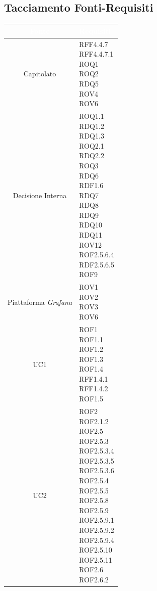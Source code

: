 \subsection{Tacciamento Fonti-Requisiti}\label{Tracciamento}
\begin{center}
\begin{longtable}[c]{|c|m{}|}
\hline
\rowcolor{bluelogo}\textbf{\textcolor{white}{Fonte}} & \textbf{\textcolor{white}{Requisiti}}\\
\hline \hline
\endhead
Capitolato & \makecell{RFF4.4.7\\RFF4.4.7.1\\ROQ1\\ROQ2\\RDQ5\\ROV4\\ROV6}\\
\hline
\rowcolor{grigio}Decisione Interna & \makecell{ROQ1.1\\RDQ1.2 \\ RDQ1.3\\ROQ2.1\\RDQ2.2\\ROQ3\\RDQ6\\RDF1.6\\RDQ7\\RDQ8 \\ RDQ9 \\ RDQ10 \\ RDQ11\\ROV12\\ROF2.5.6.4\\RDF2.5.6.5\\ROF9}\\
\hline
Piattaforma \textit{Grafana} & \makecell{ROV1\\ROV2\\ROV3\\ROV6}\\
\hline
\rowcolor{grigio}UC1 & \makecell{ROF1\\ROF1.1\\ROF1.2\\ROF1.3\\ROF1.4\\RFF1.4.1\\RFF1.4.2\\ROF1.5}\\
\hline
UC2 & \makecell{ROF2\\ROF2.1.2\\ROF2.5\\ROF2.5.3\\ROF2.5.3.4\\ROF2.5.3.5\\ROF2.5.3.6\\ROF2.5.4\\ROF2.5.5\\ROF2.5.8\\ROF2.5.9\\ROF2.5.9.1\\ROF2.5.9.2\\ROF2.5.9.4\\ROF2.5.10\\ ROF2.5.11\\ROF2.6\\ROF2.6.2}\\

\end{longtable}
\end{center}

